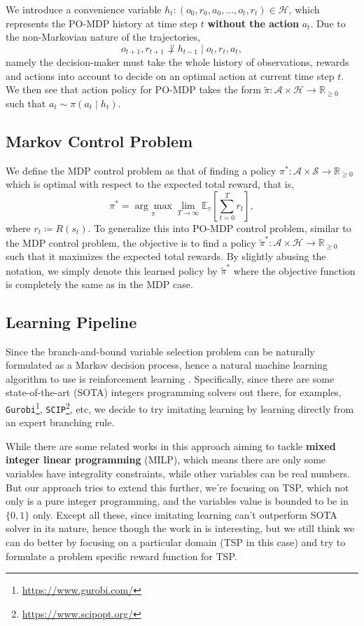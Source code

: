 \documentclass{article}
\begin{document}
We introduce a convenience variable \(h_t\colon (o_0, r_0, a_0, \ldots, o_t, r_t)\in \mathcal{H}\), which represents the PO-MDP history at time step \(t\) \textbf{without the
	action} \(a_t\).  Due to the non-Markovian nature of the trajectories,
\[
	o_{t+1}, r_{t+1}\not\perp h_{t-1} \mid o_t,r_t,a_t,
\]
namely the decision-maker must take the whole history of observations, rewards and actions into account to decide on an optimal action at current time step \(t\). We then see
that action policy for PO-MDP takes the form
\(\widetilde{\pi}\colon \mathcal{A}\times \mathcal{H}\to \mathbb{R}_{\geq 0}\) such that \(a_t\sim \pi (a_t\mid h_t)\).

\subsection{Markov Control Problem}
We define the MDP control problem as that of finding a policy \(\pi ^\ast\colon \mathcal{A}\times \mathcal{S}\to \mathbb{R}_{\geq 0}\)
which is optimal with respect to the expected total reward, that is,
\[
	\pi^\ast = \underset{\pi}{\arg\max} \lim_{T\to \infty}\mathbb{E}_\tau\left[\sum_{t=0}^T r_t\right],
\]
where \(r_t\coloneqq R(s_t)\). To generalize this into PO-MDP control problem, similar to the MDP control problem, the objective is to find a policy
\(\widetilde{\pi}^\ast\colon \mathcal{A}\times \mathcal{H}\to \mathbb{R}_{\geq 0}\) such that it maximizes the expected total rewards. By slightly abusing the notation, we
simply denote this learned policy by \(\widetilde{\pi}^\ast\) where the objective function is completely the same as in the MDP case.

\subsection{Learning Pipeline}
Since the branch-and-bound variable selection problem can be naturally formulated as a Markov decision process, hence a natural machine learning algorithm to use is reinforcement learning \cite{sutton2018reinforcement}.
Specifically, since there are some state-of-the-art (SOTA) integers programming solvers out there, for examples, \texttt{Gurobi}\footnote{\url{https://www.gurobi.com/}}, \texttt{SCIP}\footnote{\url{https://www.scipopt.org/}}, etc,
we decide to try imitating learning\cite{Imitation-Learning-A-Survey-of-Learning-Methods} by learning directly from an expert branching rule.

While there are some related works in this approach \cite{GasseCFCL19} aiming to tackle \textbf{mixed integer linear programming} (MILP), which means there are only some variables have integrality constraints, while
other variables can be real numbers. But our approach tries to extend this further, we're focusing on TSP, which not only is a pure integer programming, and the variables value is bounded to be in \(\{0, 1\}\) only.
Except all these, since imitating learning can't outperform SOTA solver in its nature, hence though the work in \cite{GasseCFCL19} is interesting, but we still think we can do better by focusing on a particular domain (TSP
in this case) and try to formulate a problem specific reward function for TSP.
\end{document}
